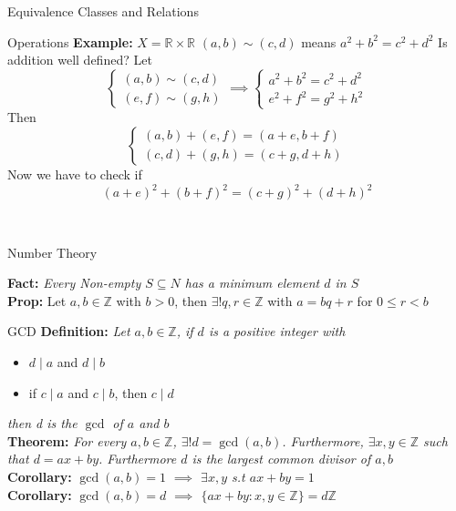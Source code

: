 \documentclass{article}
\begin{document}
\begin{multicols*}{3}
\begin{blackbox}{Equivalence Classes and Relations}
\begin{brownbox}{Operations}
    \textbf{Example:} $X = \mathbb{R} \times \mathbb{R}$ $(a,b) \sim (c,d)$ means $a^2 + b^2 = c^2 + d^2$ Is addition well defined? Let\\[-1ex]
    \[\begin{cases}
        (a,b) \sim (c,d)\\
        (e,f) \sim (g,h)
    \end{cases} \implies \begin{cases}
        a^2 + b^2 = c^2 + d^2\\
        e^2 + f^2 = g^2 + h^2
    \end{cases}\]
    Then\\[-3ex]
    \[\begin{cases}
        (a,b) + (e,f) = (a+e, b+f)\\
        (c,d) + (g,h) = (c+g, d+h)
    \end{cases}\]
    Now we have to check if\\[-1.5ex]
    \[(a+e)^2 + (b+f)^2 = (c+g)^2 + (d+h)^2\]
    \end{brownbox}\\[-2ex]
\end{blackbox}
\begin{blackbox}{Number Theory}
\raggedright
\textbf{Fact:}\textit{ Every Non-empty $S \subseteq N$ has a minimum element $d$ in $S$}\\[0.5ex]
\textbf{Prop:} Let $a, b \in \mathbb{Z}$ with $b > 0$, then $\exists ! q,r \in \mathbb{Z}$ with $a = bq + r$ for $0 \leq r < b$\\[0.75ex]
\begin{bluebox}{GCD}
    \textbf{Definition:} \textit{ Let $a,b \in \mathbb{Z}$, if $d$ is a positive integer with}\\[-4ex]
    \begin{itemize}
        \item $d \mid a$ and $d \mid b$
        \item if $c \mid a$ and $c \mid b$, then $c \mid d$
    \end{itemize}
    \textit{then d is the $\gcd$ of $a$ and $b$}\\[0.5ex]
    \textbf{Theorem:} \textit{For every $a,b \in \mathbb{Z}$, $\exists ! d = \gcd(a,b)$. Furthermore, $\exists x,y \in \mathbb{Z}$ such that $d =   ax+ by$. Furthermore $d$ is the largest common divisor of $a,b$}\\[0.5ex]
    \textbf{Corollary:} \textit{$\gcd(a,b) = 1$ $\implies$ $\exists x,y$ s.t $ax + by = 1$}\\[0.5ex]
    \textbf{Corollary:} \textit{$\gcd(a,b) = d$ $\implies$ $\{ax + by: x,y \in \mathbb{Z}\} = d\mathbb{Z}$}

\end{bluebox}
\end{blackbox}
\end{multicols*}
\end{document}
